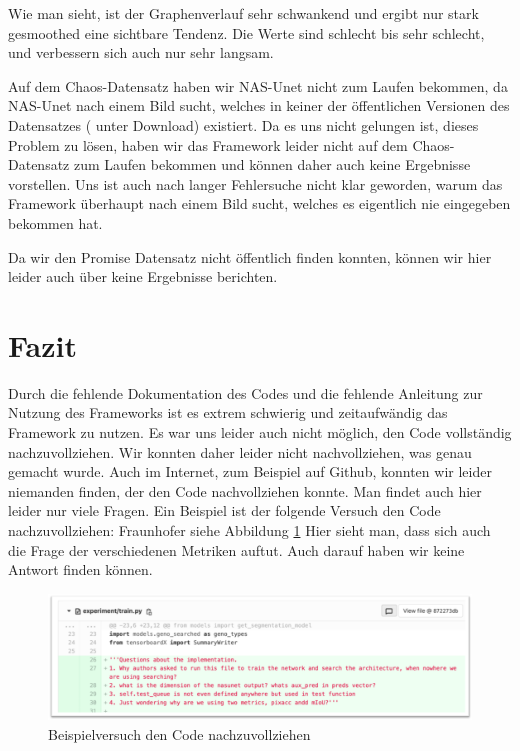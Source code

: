 Wie man sieht, ist der Graphenverlauf sehr schwankend und ergibt nur stark gesmoothed eine sichtbare Tendenz. Die Werte sind schlecht bis sehr schlecht, und verbessern sich auch nur sehr langsam.

Auf dem Chaos-Datensatz haben wir NAS-Unet nicht zum Laufen bekommen, da NAS-Unet nach einem Bild sucht, welches in keiner der öffentlichen Versionen des Datensatzes (\cite{ChaosDatensatz} unter Download) existiert. Da es uns nicht gelungen ist, dieses Problem zu lösen, haben wir das Framework leider nicht auf dem Chaos-Datensatz zum Laufen bekommen und können daher auch keine Ergebnisse vorstellen. Uns ist auch nach langer Fehlersuche nicht klar geworden, warum das Framework überhaupt nach einem Bild sucht, welches es eigentlich nie eingegeben bekommen hat. 

Da wir den Promise Datensatz nicht öffentlich finden konnten, können wir hier leider auch über keine Ergebnisse berichten.


\section{Fazit}

Durch die fehlende Dokumentation des Codes und die fehlende Anleitung zur Nutzung des Frameworks ist es extrem schwierig und zeitaufwändig das Framework zu nutzen. Es war uns leider auch nicht möglich, den Code vollständig nachzuvollziehen. Wir konnten daher leider nicht nachvollziehen, was genau gemacht wurde. Auch im Internet, zum Beispiel auf Github, konnten wir leider niemanden finden, der den Code nachvollziehen konnte. Man findet auch hier leider nur viele Fragen. Ein Beispiel ist der folgende Versuch den Code nachzuvollziehen: Fraunhofer siehe Abbildung \ref{pic:nasUnet_FrauenhoferScreenshot} Hier sieht man, dass sich auch die Frage der verschiedenen Metriken auftut. Auch darauf haben wir keine Antwort finden können.

\begin{figure}[H]
	
	\centering
	\includegraphics[scale=0.6]{Pictures/nasUnet/Bild6.png}
	\caption{Beispielversuch den Code nachzuvollziehen \cite{Frauenhofer_NasUnet} }
	\label{pic:nasUnet_FrauenhoferScreenshot}
\end{figure}

